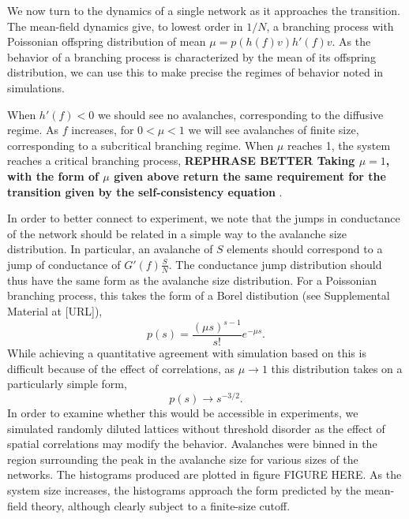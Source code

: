 \documentclass[aps,prl,reprint,groupedaddress]{revtex4-1}
\begin{document}
We now turn to the dynamics of a single network as it approaches the
transition. The mean-field dynamics give, to lowest order in $1/N$, a
branching process with Poissonian offspring distribution of mean
$\mu = p(h(f)v)h'(f)v$.   As the behavior of a
branching process is characterized by the mean of its offspring distribution,
we can use this to make precise the regimes of behavior noted in simulations.

When $h'(f)<0$ we should see no avalanches, corresponding to the diffusive
regime.  As $f$ increases, for $0<\mu < 1$ we will see avalanches of finite
size, corresponding to a subcritical branching regime.  When $\mu$ reaches 1,
the system reaches a critical branching process, {\bf REPHRASE BETTER Taking $\mu=1$, with the form of
$\mu$ given above return the same requirement for the transition given by the
self-consistency equation }.

In order to better connect to
experiment, we note that the jumps in conductance of the network should be 
related in a simple way to the avalanche size distribution.  In particular,
an avalanche of $S$ elements should correspond to a jump of conductance of
$G'(f)\frac{S}{N}$.  The conductance jump distribution should thus have the
same form as the avalanche size distribution. For a Poissonian branching
process, this takes the form of a Borel distibution
(see Supplemental Material at [URL]),
\begin{equation}
p(s) = \frac{(\mu s)^{s-1}}{s!}e^{-\mu s}.
\end{equation}
While achieving a quantitative agreement with simulation based on this is
difficult because of the effect of correlations,
as $\mu\to 1$ this distribution takes on a particularly simple form,
\begin{equation}
p(s) \to s^{-3/2}.
\end{equation}
In order to examine whether this would be accessible in experiments, we
simulated randomly diluted lattices without threshold disorder as the
effect of spatial correlations may modify the behavior.  Avalanches were
binned in the region surrounding the peak in the avalanche size for
various sizes of the networks. The histograms produced are plotted in
figure FIGURE HERE. As the system size increases, the histograms approach
the form predicted by the mean-field theory, although clearly subject to a finite-size
cutoff.
\end{document}
